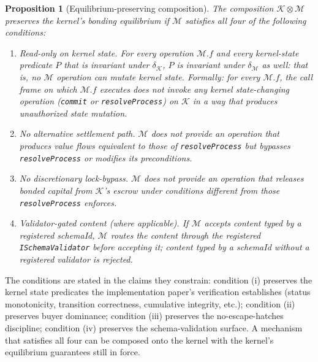 \documentclass[11pt,a4paper]{article}
\newtheorem{proposition}[theorem]{Proposition}
\theoremstyle{definition}
\theoremstyle{remark}
\begin{document}
\begin{proposition}[Equilibrium-preserving composition]
\label{prop:coordinator}
The composition $\mathcal{K} \otimes \mathcal{M}$ preserves the
kernel's bonding equilibrium if $\mathcal{M}$ satisfies all four of
the following conditions:
\begin{enumerate}[label=(\roman*)]
  \item \emph{Read-only on kernel state.} For every operation
    $\mathcal{M}.f$ and every kernel-state predicate $P$ that is
    invariant under $\delta_{\mathcal{K}}$, $P$ is invariant under
    $\delta_{\mathcal{M}}$ as well: that is, no $\mathcal{M}$
    operation can mutate kernel state. Formally: for every
    $\mathcal{M}.f$, the call frame on which $\mathcal{M}.f$
    executes does not invoke any kernel state-changing operation
    (\texttt{commit} or \texttt{resolveProcess}) on $\mathcal{K}$
    in a way that produces unauthorized state mutation.
  \item \emph{No alternative settlement path.} $\mathcal{M}$ does
    not provide an operation that produces value flows equivalent
    to those of \texttt{resolveProcess} but bypasses
    \texttt{resolveProcess} or modifies its preconditions.
  \item \emph{No discretionary lock-bypass.} $\mathcal{M}$ does not
    provide an operation that releases bonded capital from
    $\mathcal{K}$'s escrow under conditions different from those
    \texttt{resolveProcess} enforces.
  \item \emph{Validator-gated content (where applicable).} If
    $\mathcal{M}$ accepts content typed by a registered schemaId,
    $\mathcal{M}$ routes the content through the registered
    \texttt{ISchemaValidator} before accepting it; content typed by
    a schemaId without a registered validator is rejected.
\end{enumerate}
\end{proposition}

The conditions are stated in the claims they constrain: condition
(i) preserves the kernel state predicates the implementation paper's
verification establishes (status monotonicity, transition
correctness, cumulative integrity, etc.); condition (ii) preserves
buyer dominance; condition (iii) preserves the no-escape-hatches
discipline; condition (iv) preserves the schema-validation surface.
A mechanism that satisfies all four can be composed onto the kernel
with the kernel's equilibrium guarantees still in force.
\end{document}

